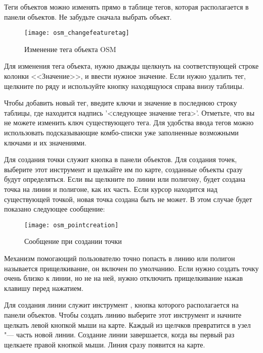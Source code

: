 
Теги объектов можно изменять прямо в таблице тегов, которая
располагается в панели объектов. Не забудьте сначала выбрать объект.

\begin{figure}[ht]
   \centering
   \texttt{[image: osm\_changefeaturetag]}
   \caption{Изменение тега объекта OSM \wincaption}\label{fig:osmchfeattag}
\end{figure}

Для изменения тега объекта, нужно дважды щелкнуть на соответствующей
строке колонки <<Значение>>, и ввести нужное значение. Если нужно удалить
тег, щелкните по ряду и используйте кнопку 
находящуюся справа внизу таблицы.

Чтобы добавить новый тег, введите ключи и значение в последнюю строку
таблицы, где находится надпись '<следующее значение тега>'. Отметьте,
что вы не можете изменить ключ существующего тега. Для удобства ввода
тегов можно использовать подсказывающие комбо-списки уже заполненные
возможными ключами и их значениями.


Для создания точки служит кнопка 
в панели объектов. Для создания точек, выберите этот инструмент и
щелкайте им по карте, созданные объекты сразу будут определяться. Если
вы щелкните по линии или полигону, будет создана точка на линии и
полигоне, как их часть. Если курсор находится над существующей точкой,
новая точка создана быть не может. В этом случае будет показано
следующее сообщение:

\begin{figure}[ht]
   \centering
   \texttt{[image: osm\_pointcreation]}
   \caption{Сообщение при создании точки \wincaption}\label{fig:osmpoicreat}
\end{figure}

Механизм помогающий пользователю точно попасть в линию или полигон
называется прищелкивание, он включен по умолчанию. Если нужно создать
точку очень близко к линии, но не на ней, нужно отключить прищелкивание
нажав клавишу  перед нажатием.


Для создания линии служит инструмент ,
кнопка которого располагается на панели объектов. Чтобы создать линию
выберите этот инструмент и начните щелкать левой кнопкой мыши на карте.
Каждый из щелчков превратится в узел "--- часть новой линии. Создание
линии завершается, когда вы первый раз щелкаете правой кнопкой мыши.
Линия сразу появится на карте.

